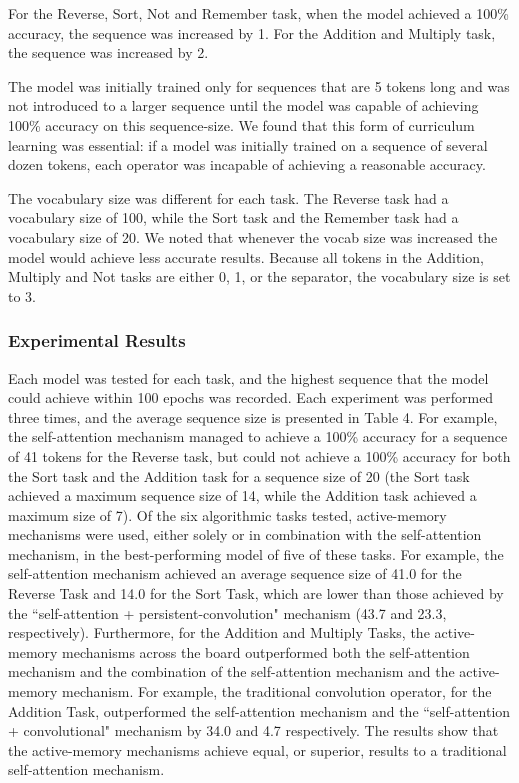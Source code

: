 \documentclass{article}
\begin{document}
For the Reverse, Sort, Not and Remember task, when the model achieved a 100\% accuracy, the sequence was increased by 1. For the Addition and Multiply task, the sequence was increased by 2.

The model was initially trained only for sequences that are 5 tokens long and was not introduced to a larger sequence until the model was capable of achieving 100\% accuracy on this sequence-size. We found that this form of curriculum learning was essential: if a model was initially trained on a sequence of several dozen tokens, each operator was incapable of achieving a reasonable accuracy.

The vocabulary size was different for each task. The Reverse task had a vocabulary size of 100, while the Sort task and the Remember task had a vocabulary size of 20. We noted that whenever the vocab size was increased the model would achieve less accurate results. Because all tokens in the Addition, Multiply and Not tasks are either 0, 1, or the separator, the vocabulary size is set to 3.

\subsubsection{Experimental Results}

Each model was tested for each task, and the highest sequence that the model could achieve within 100 epochs was recorded. Each experiment was performed three times, and the average sequence size is presented in Table 4. For example, the self-attention mechanism managed to achieve a 100\% accuracy for a sequence of 41 tokens for the Reverse task, but could not achieve a 100\% accuracy for both the Sort task and the Addition task for a sequence size of 20 (the Sort task achieved a maximum sequence size of 14, while the Addition task achieved a maximum size of 7). 
Of the six algorithmic tasks tested, active-memory mechanisms were used, either solely or in combination with the self-attention mechanism, in the best-performing model of five of these tasks. 
For example, the self-attention mechanism achieved an average sequence size of 41.0 for the Reverse Task and 14.0 for the Sort Task, which are lower than those achieved by the ``self-attention + persistent-convolution" mechanism (43.7 and 23.3, respectively). Furthermore, for the Addition and Multiply Tasks, the active-memory mechanisms across the board outperformed both the self-attention mechanism and the combination of the self-attention mechanism and the active-memory mechanism. For example, the traditional convolution operator, for the Addition Task, outperformed the self-attention mechanism and the ``self-attention + convolutional" mechanism by 34.0 and 4.7 respectively.
The results show that the active-memory mechanisms achieve equal, or superior, results to a traditional self-attention mechanism.
\end{document}
